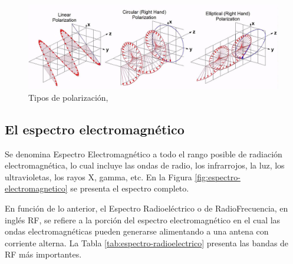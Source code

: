 \begin{description}
\begin{figure}[!htb]
  \centering
    \includegraphics[width=\textwidth]{06.radionavegacion/Imagenes/06.00.ondas.electromagneticas/polarizacion_ondas_EM.jpg}    
    \caption{Tipos de polarizaci\'on, \protect\cite{PolarizacionImagenes}%
    }
  \label{fig:06.tipos.polarizacion}
\end{figure}






\end{description}


\subsection{El espectro electromagn\'etico}

Se denomina Espectro Electromagn\'etico a todo el rango posible de radiaci\'on electromagn\'etica, lo cual incluye las ondas de radio, los infrarrojos, la luz, los ultravioletas, los rayos X, gamma, etc.
  En la Figura \ref{fig:espectro-electromagnetico} se presenta el espectro completo.

En funci\'on de lo anterior, el Espectro Radioel\'ectrico o de RadioFrecuencia, 
 en ingl\'es \ac{RF},
 se refiere a la porci\'on del espectro electromagn\'etico en el cual las ondas electromagn\'eticas pueden generarse alimentando a una antena con corriente alterna. La Tabla \ref{tab:espectro-radioelectrico}   presenta las bandas de RF m\'as importantes. 

